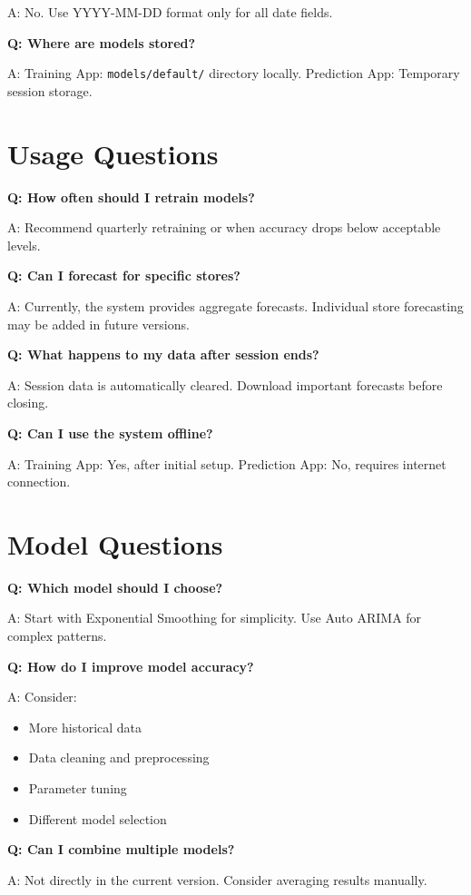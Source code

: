 A: No. Use YYYY-MM-DD format only for all date fields.

\textbf{Q: Where are models stored?}

A: Training App: \verb|models/default/| directory locally. Prediction App: Temporary session storage.

\section{Usage Questions}

\textbf{Q: How often should I retrain models?}

A: Recommend quarterly retraining or when accuracy drops below acceptable levels.

\textbf{Q: Can I forecast for specific stores?}

A: Currently, the system provides aggregate forecasts. Individual store forecasting may be added in future versions.

\textbf{Q: What happens to my data after session ends?}

A: Session data is automatically cleared. Download important forecasts before closing.

\textbf{Q: Can I use the system offline?}

A: Training App: Yes, after initial setup. Prediction App: No, requires internet connection.

\section{Model Questions}

\textbf{Q: Which model should I choose?}

A: Start with Exponential Smoothing for simplicity. Use Auto ARIMA for complex patterns.

\textbf{Q: How do I improve model accuracy?}

A: Consider:
\begin{itemize}
	\item More historical data
	\item Data cleaning and preprocessing
	\item Parameter tuning
	\item Different model selection
\end{itemize}

\textbf{Q: Can I combine multiple models?}

A: Not directly in the current version. Consider averaging results manually.

